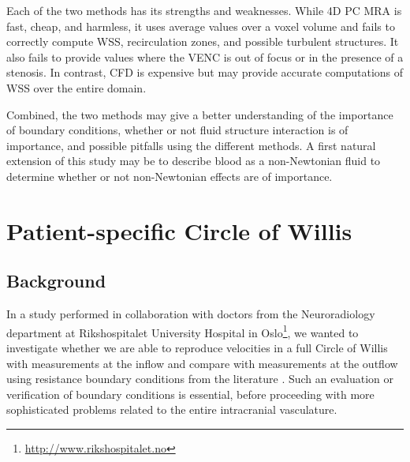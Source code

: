 Each of the two methods has its strengths and weaknesses. While 4D PC
MRA is fast, cheap, and harmless, it uses average values over a voxel
volume and fails to correctly compute WSS, recirculation zones, and
possible turbulent structures. It also fails to provide values where
the VENC is out of focus or in the presence of a stenosis. In
contrast, CFD is expensive but may provide accurate computations of
WSS over the entire domain.

Combined, the two methods may give a better understanding of the
importance of boundary conditions, whether or not fluid structure
interaction is of importance, and possible pitfalls using the
different methods. A first natural extension of this study may be to
describe blood as a non-Newtonian fluid to determine whether or not
non-Newtonian effects are of importance.

\section{Patient-specific Circle of Willis} \label{cok}

\subsection{Background}

In a study performed in collaboration with doctors from the
Neuroradiology department at Rikshospitalet University Hospital in
Oslo\footnote{\url{http://www.rikshospitalet.no}}, we wanted to
investigate whether we are able to reproduce velocities in a full
Circle of Willis with measurements at the inflow and compare with
measurements at the outflow using resistance boundary conditions from
the
literature \citep{AlastrueyParkerPeiroEtAl2007,Vignon-ClementelFigueroaJansenEtAl2006}.
Such an evaluation or verification of boundary conditions is
essential, before proceeding with more sophisticated problems related
to the entire intracranial vasculature.

